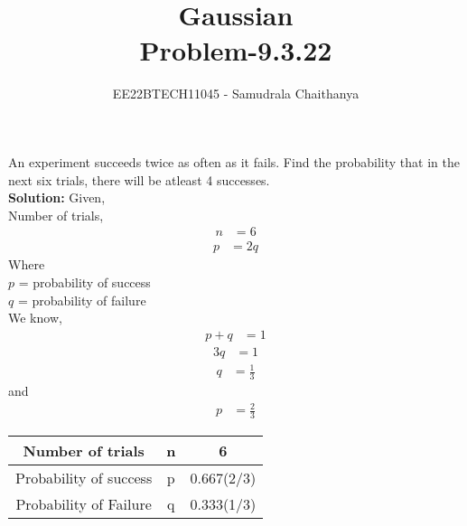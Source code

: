 \documentclass[journal,12pt,onecolumn]{article}
\theoremstyle{remark}
\newcommand{\solution}{\noindent \textbf{Solution: }}
\begin{document}
\title{Gaussian\\ Problem-9.3.22}
\date{}
\author{EE22BTECH11045 - Samudrala Chaithanya}
\maketitle
An experiment succeeds twice as often as it fails. Find the probability that in the next six trials, there will be atleast 4 successes. \\
\solution
Given, \\Number of trials,
\begin{align}
n &= 6
\end{align}
\begin{align}
p &= 2q
\end{align}
Where\\
$p$ = probability of success\\
$q$ = probability of failure\\
We know, 
\begin{align}
p + q &= 1
\end{align}
\begin{align}
 3q &= 1
\end{align}
\begin{align}
q &= \frac{1}{3}
\end{align}
and
\begin{align}
p &= \frac{2}{3}
\end{align}
\begin{tabular}[]{|c|c|c|}
\hline
Number of trials	&n	&6\\ 
\hline
Probability of success	&p	&0.667(2/3)\\
\hline
Probability of Failure	&q	&0.333(1/3)\\
\hline
\end{tabular}
\end{document}
